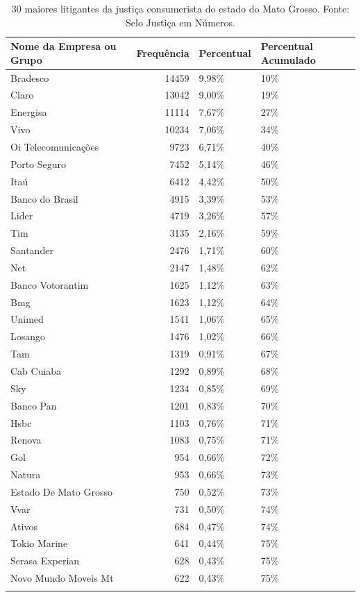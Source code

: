 \documentclass[]{report}
\begin{document}
\begin{longtable}{lrll}
\caption{30 maiores litigantes da justiça consumerista do estado do Mato Grosso. Fonte: Selo Justiça em Números.} \\
  \hline
Nome da Empresa ou Grupo & Frequência & Percentual & Percentual Acumulado \\
  \hline
Bradesco & 14459 & 9,98\% & 10\% \\
  Claro & 13042 & 9,00\% & 19\% \\
  Energisa & 11114 & 7,67\% & 27\% \\
  Vivo & 10234 & 7,06\% & 34\% \\
  Oi
Telecomunicações & 9723 & 6,71\% & 40\% \\
  Porto Seguro & 7452 & 5,14\% & 46\% \\
  Itaú & 6412 & 4,42\% & 50\% \\
  Banco do Brasil & 4915 & 3,39\% & 53\% \\
  Lider & 4719 & 3,26\% & 57\% \\
  Tim & 3135 & 2,16\% & 59\% \\
  Santander & 2476 & 1,71\% & 60\% \\
  Net & 2147 & 1,48\% & 62\% \\
  Banco
Votorantim & 1625 & 1,12\% & 63\% \\
  Bmg & 1623 & 1,12\% & 64\% \\
  Unimed & 1541 & 1,06\% & 65\% \\
  Losango & 1476 & 1,02\% & 66\% \\
  Tam & 1319 & 0,91\% & 67\% \\
  Cab Cuiaba & 1292 & 0,89\% & 68\% \\
  Sky & 1234 & 0,85\% & 69\% \\
  Banco Pan & 1201 & 0,83\% & 70\% \\
  Hsbc & 1103 & 0,76\% & 71\% \\
  Renova & 1083 & 0,75\% & 71\% \\
  Gol & 954 & 0,66\% & 72\% \\
  Natura & 953 & 0,66\% & 73\% \\
  Estado De Mato
Grosso & 750 & 0,52\% & 73\% \\
  Vvar & 731 & 0,50\% & 74\% \\
  Ativos & 684 & 0,47\% & 74\% \\
  Tokio Marine & 641 & 0,44\% & 75\% \\
  Serasa Experian & 628 & 0,43\% & 75\% \\
  Novo Mundo
Moveis Mt & 622 & 0,43\% & 75\% \\
   \hline
\hline
\label{unnamed-chunk-42}
\end{longtable}
\end{document}
